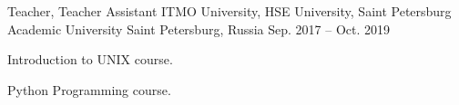 

\begin{cventries}

  \cventry
    {Teacher, Teacher Assistant} %
    {ITMO University, HSE University, Saint Petersburg Academic University} %
    {Saint Petersburg, Russia} %
    {Sep. 2017 -- Oct. 2019} %
    {
      \begin{cvitems} %
        \item {Introduction to UNIX course.}
        \item {Python Programming course.}
      \end{cvitems}
    }

\end{cventries}
